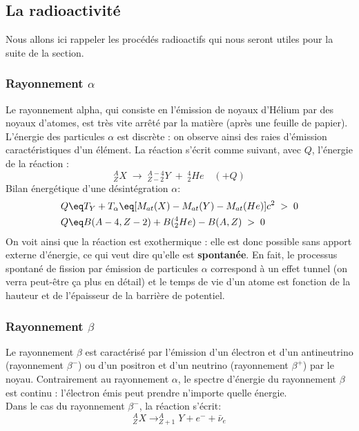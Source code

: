\subsection{La radioactivité}


Nous allons ici rappeler les procédés radioactifs qui nous seront utiles pour la suite de la section.

\subsubsection{Rayonnement $\alpha$}

Le rayonnement alpha, qui consiste en l'émission de noyaux d'Hélium par des noyaux d'atomes, est très vite arrêté par la matière (après une feuille de papier). L'énergie des particules $\alpha$ est discrète : on observe ainsi des raies d'émission caractéristiques d'un élément. La réaction s'écrit comme suivant, avec $Q$, l'énergie de la réaction :
\begin{equation*}
    ^{A}_{Z}X \;\rightarrow\; ^{A-4}_{Z-2}Y \;+\; ^{4}_{2}He \quad(+Q)
\end{equation*}
Bilan énergétique d'une désintégration $\alpha$:
\begin{align*}
    Q &\eq
    T_Y + T_\alpha \eq [M_{at}(X)-M_{at}(Y)-M_{at}(He)]c^2 \;>\;0\\
    Q &\eq B(A-4,Z-2)+B(^{4}_{2}He)-B(A,Z) \;>\;0
\end{align*}
On voit ainsi que la réaction est exothermique : elle est donc possible sans apport externe d'énergie, ce qui veut dire qu'elle est \textbf{spontanée}. En fait, le processus spontané de fission par émission de particules $\alpha$ correspond à un effet tunnel (on verra peut-être ça plus en détail) et le temps de vie d'un atome est fonction de la hauteur et de l'épaisseur de la barrière de potentiel.

\subsubsection{Rayonnement $\beta$}


Le rayonnement $\beta$ est caractérisé par l'émission d'un électron et d'un antineutrino (rayonnement $\beta^-$) ou d'un positron et d'un neutrino (rayonnement $\beta^+$) par le noyau. Contrairement au rayonnement $\alpha$, le spectre d'énergie du rayonnement $\beta$ est continu : l'électron émis peut prendre n'importe quelle énergie.\\
Dans le cas du rayonnement $\beta^-$, la réaction s'écrit:
\begin{equation*}
    ^{A}_{Z}X \rightarrow ^{A}_{Z+1}Y + e^- + \bar{\nu}_e
\end{equation*}

